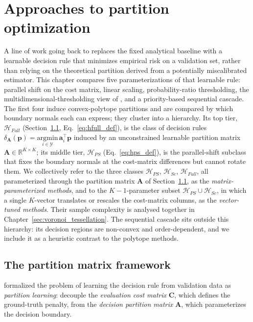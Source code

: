 \chapter{Approaches to partition optimization}\label{sec:partition_optimization}

A line of work going back to \citet{obrien2008costsensitive} replaces the fixed analytical baseline with a learnable decision rule that minimizes empirical risk on a validation set, rather than relying on the theoretical partition derived from a potentially miscalibrated estimator. This chapter compares five parameterizations of that learnable rule: parallel shift on the cost matrix, linear scaling, probability-ratio thresholding, the multidimensional-thresholding view of \citet{legnaro2025multiclass}, and a priority-based sequential cascade. The first four induce convex-polytope partitions and are compared by which boundary normals each can express; they cluster into a hierarchy. Its top tier, $\mathcal{H}_{Full}$ (Section~\ref{sec:partition_matrix_framework}, Eq.~\ref{eq:hfull_def}), is the class of decision rules $\delta_{\mathbf{A}}(\mathbf{p}) = \underset{i \in \mathcal{Y}}{\mathrm{argmin}} \, \mathbf{a}_i^\top \mathbf{p}$ induced by an unconstrained learnable partition matrix $\mathbf{A} \in \mathbb{R}^{K \times K}$; its middle tier, $\mathcal{H}_{PS}$ (Eq.~\ref{eq:hps_def}), is the parallel-shift subclass that fixes the boundary normals at the cost-matrix differences but cannot rotate them. We collectively refer to the three classes $\mathcal{H}_{PS}$, $\mathcal{H}_{Sc}$, $\mathcal{H}_{Full}$, all parameterized through the partition matrix $\mathbf{A}$ of Section~\ref{sec:partition_matrix_framework}, as the \emph{matrix-parameterized methods}, and to the $K{-}1$-parameter subset $\mathcal{H}_{PS} \cup \mathcal{H}_{Sc}$, in which a single $K$-vector translates or rescales the cost-matrix columns, as the \emph{vector-tuned methods}. Their sample complexity is analysed together in Chapter~\ref{sec:voronoi_tessellation}. The sequential cascade sits outside this hierarchy: its decision regions are non-convex and order-dependent, and we include it as a heuristic contrast to the polytope methods.

\section{The partition matrix framework}\label{sec:partition_matrix_framework}

\citet{obrien2008costsensitive} formalized the problem of learning the decision rule from validation data as \textit{partition learning}: decouple the \textit{evaluation cost matrix} $\mathbf{C}$, which defines the ground-truth penalty, from the \textit{decision partition matrix} $\mathbf{A}$, which parameterizes the decision boundary.

